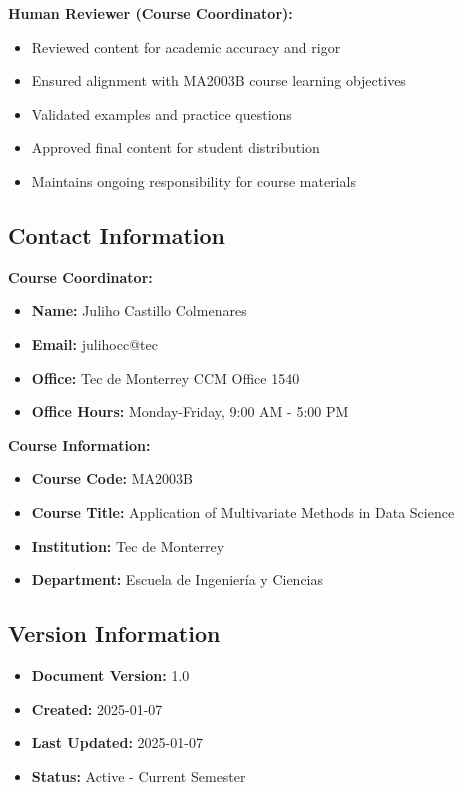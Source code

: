 \documentclass[
]{article}
\begin{document}
\textbf{Human Reviewer (Course Coordinator):}

\begin{itemize}
\item
  Reviewed content for academic accuracy and rigor
\item
  Ensured alignment with MA2003B course learning objectives
\item
  Validated examples and practice questions
\item
  Approved final content for student distribution
\item
  Maintains ongoing responsibility for course materials
\end{itemize}

\textbf{ }

\subsection{Contact Information}

\textbf{Course Coordinator:}

\begin{itemize}
\item
  \textbf{Name:} Juliho Castillo Colmenares
\item
  \textbf{Email:} julihocc@tec
\item
  \textbf{Office:} Tec de Monterrey CCM Office 1540
\item
  \textbf{Office Hours:} Monday-Friday, 9:00 AM - 5:00 PM
\end{itemize}

\textbf{Course Information:}

\begin{itemize}
\item
  \textbf{Course Code:} MA2003B
\item
  \textbf{Course Title:} Application of Multivariate Methods in Data
  Science
\item
  \textbf{Institution:} Tec de Monterrey
\item
  \textbf{Department:} Escuela de Ingeniería y Ciencias
\end{itemize}

\textbf{ }

\subsection{Version Information}

\begin{itemize}
\item
  \textbf{Document Version:} 1.0
\item
  \textbf{Created:} 2025-01-07
\item
  \textbf{Last Updated:} 2025-01-07
\item
  \textbf{Status:} Active - Current Semester
\end{itemize}
\end{document}
